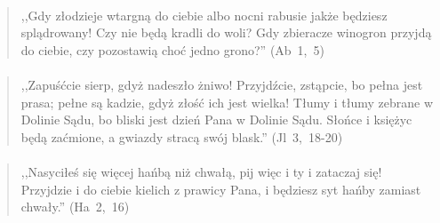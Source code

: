 \documentclass[10pt,a4paper,oneside]{article}
\begin{document}
\paragraph{}
\begin{quote}
,,Gdy złodzieje wtargną do ciebie albo nocni rabusie jakże będziesz splądrowany! Czy nie będą kradli do woli? Gdy zbieracze winogron przyjdą do ciebie, czy pozostawią choć jedno grono?'' \mbox{(Ab 1, 5)}
\end{quote}
\paragraph{}
\begin{quote}
,,Zapuśćcie sierp, gdyż nadeszło żniwo! Przyjdźcie, zstąpcie, bo pełna jest prasa; pełne są kadzie, gdyż złość ich jest wielka! Tłumy i tłumy zebrane w Dolinie Sądu, bo bliski jest dzień Pana w Dolinie Sądu. Słońce i księżyc będą zaćmione, a gwiazdy stracą swój blask.'' \mbox{(Jl 3, 18-20)}
\end{quote}
\paragraph{}
\begin{quote}
,,Nasyciłeś się więcej hańbą niż chwałą, pij więc i ty i zataczaj się! Przyjdzie i do ciebie kielich z prawicy Pana, i będziesz syt hańby zamiast chwały.'' \mbox{(Ha 2, 16)}
\end{quote}
\end{document}
